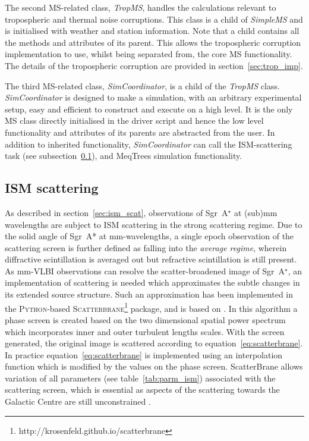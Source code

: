 The second MS-related class, \emph{TropMS}, handles the calculations relevant to tropospheric and thermal noise corruptions. This class is a child of {\it SimpleMS} and is initialised with weather and station information. Note that a child contains all the methods and attributes of its parent. This allows the tropospheric corruption implementation to use, whilst being separated from, the core MS functionality. The details of the tropospheric corruption are provided in section~\ref{sec:trop_imp}. 

The third MS-related class, \emph{SimCoordinator}, is a child of the {\it TropMS} class. {\it SimCoordinator} is designed to make a simulation, with an arbitrary experimental setup, easy and efficient to construct and execute on a high level. It is the only MS class directly initialised in the driver script and hence the low level functionality and attributes of its parents are abstracted from the user. In addition to inherited functionality, {\it SimCoordinator} can call the ISM-scattering task (see subsection~\ref{sec:ism_imp}), and {\sc MeqTrees} simulation functionality.
 

\subsection{ISM scattering}\label{sec:ism_imp}

As described in section~\ref{sec:ism_scat}, observations of Sgr~A$^\star$ at (sub)mm wavelengths are subject to ISM scattering in the strong scattering regime. Due to the solid angle of Sgr~A* at mm-wavelengths, a single epoch observation of the scattering screen is further defined as falling into the \emph{average regime}, wherein diffractive scintillation is averaged out but refractive scintillation is still present. As mm-VLBI observations can resolve the scatter-broadened image of Sgr~A$^\star$, an implementation of scattering is needed which approximates the subtle changes in its extended source structure. Such an approximation has been implemented in the \textsc{Python}-based \textsc{Scatterbrane}\footnote{http://krosenfeld.github.io/scatterbrane} package, and is based on \citet*{Johnson_2015a}. In this algorithm a phase screen is created based on the two dimensional spatial power spectrum  \citep*[see][Appendix C]{Johnson_2015a} which incorporates inner and outer turbulent lengths scales. With the screen generated, the original image is scattered according to equation~\ref{eq:scatterbrane}. In practice equation~\ref{eq:scatterbrane} is implemented using an interpolation function which is modified by the values on the phase screen. {\sc ScatterBrane} allows variation of all parameters (see table~\ref{tab:parm_ism}) associated with the scattering screen, which is essential as aspects of the scattering towards the Galactic Centre are still unconstrained \citep[e.g.][]{Gwinn_2014}.





